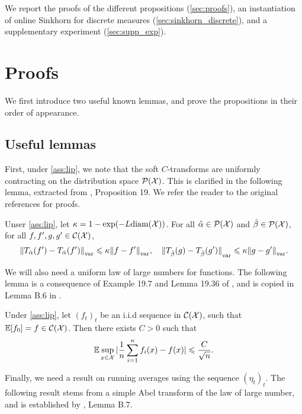 We report the proofs of the different propositions (\autoref{sec:proofs}), an instantiation of online Sinkhorn for discrete measures (\autoref{sec:sinkhorn_discrete}), and a supplementary experiment (\autoref{sec:supp_exp}).

\section{Proofs}\label{sec:proofs}

We first introduce two useful known lemmas, and prove the propositions in their order of appearance.

\subsection{Useful lemmas}

First, under \autoref{ass:lip}, we note that the soft $C$-transforms are
 uniformly contracting on the distribution space $\mathcal{P}(\mathcal{X})$. This is clarified
 in the following lemma, extracted from \citet{vialard2019elementary},
 Proposition 19. We refer the reader to the original references for proofs.

\begin{lemma}\label{lemma:contractance}
    Unser \autoref{ass:lip}, let $\kappa = 1 - \exp(-L
    \textnormal{diam}(\mathcal{X}))$. For all $\hat \alpha \in \mathcal{P}(\mathcal{X})$ and $\hat \beta \in
    \mathcal{P}(\mathcal{X})$, for all $f, f', g, g' \in \mathcal{C}(\mathcal{X})$,
    \begin{equation}
        {\Vert T_{\hat \alpha}(f') - 
        T_{\hat \alpha}(f') \Vert}_{\text{\upshape var}} \leqslant \kappa {\Vert f - f' \Vert}_{\text{\upshape var}},
        \quad
        {\Vert T_{\hat \beta}(g) - 
        T_{\hat \beta}(g') \Vert}_{\text{\upshape var}} \leqslant \kappa {\Vert g - g' \Vert}_{\text{\upshape var}}.
    \end{equation}
\end{lemma}

We will also need a uniform law of large numbers for functions. The following lemma is a consequence of Example 19.7 and
Lemma 19.36 of \citet{van_der_vaart_asymptotic_2000}, and is copied in Lemma B.6 in \citet{mairal_stochastic_2013}.

\begin{lemma}\label{lemma:lln}
    Under \autoref{ass:lip}, let $(f_t)_t$ be an i.i.d sequence in $\mathcal{C}(\mathcal{X})$,
    such that $\mathbb{E}[f_0] = f \in \mathcal{C}(\mathcal{X})$. Then there exists $C > 0$ such that
    \begin{equation}
        \mathbb{E} \sup_{x \in \mathcal{X}} | \frac{1}{n} \sum_{i=1}^n f_i(x) - f(x) |
        \leqslant \frac{C}{\sqrt{n}}.
    \end{equation}
\end{lemma}
Finally, we need a result on running averages using the sequence ${(\eta_t)}_t$. The following result stems from a simple Abel transform of the law of large number, and is established by \citet{mairal_stochastic_2013}, Lemma B.7.

